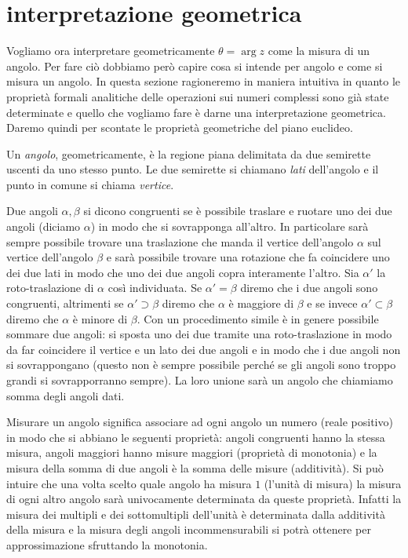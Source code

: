 \section{interpretazione geometrica}
\label{sec:radianti}

Vogliamo ora interpretare geometricamente $\theta = \arg z$ come la misura
di un angolo. Per fare ciò dobbiamo però capire cosa si intende per angolo
e come si misura un angolo.
In questa sezione ragioneremo in maniera intuitiva in quanto le proprietà
formali analitiche delle operazioni sui numeri complessi
sono già state determinate e quello
che vogliamo fare è darne una interpretazione geometrica.
Daremo quindi per scontate le proprietà geometriche del piano euclideo.

Un \emph{angolo},
geometricamente, è la regione piana delimitata da due semirette
uscenti da uno stesso punto. Le due semirette si chiamano \emph{lati}
dell'angolo e il punto in comune si chiama \emph{vertice}.

Due angoli $\alpha,\beta$ si dicono congruenti se è possibile traslare e ruotare uno dei
due angoli (diciamo $\alpha$) in modo che si sovrapponga all'altro.
In particolare sarà sempre possibile trovare una traslazione
che manda il vertice dell'angolo $\alpha$ sul vertice dell'angolo $\beta$
e sarà possibile trovare una rotazione che fa coincidere uno dei due lati
in modo che uno dei due angoli copra interamente l'altro.
Sia $\alpha'$ la roto-traslazione di $\alpha$ così individuata.
Se $\alpha'=\beta$ diremo che i due angoli sono congruenti,
altrimenti se
$\alpha' \supset \beta$ diremo che $\alpha$ è maggiore di $\beta$ e se
invece $\alpha' \subset \beta$ diremo che $\alpha$ è minore di $\beta$.
Con un procedimento simile è in genere possibile sommare due angoli:
si sposta uno dei due tramite una roto-traslazione in modo da far coincidere
il vertice e un lato dei due angoli e in modo
che i due angoli non si sovrappongano
(questo non è sempre possibile perché se gli angoli sono troppo grandi
si sovrapporranno sempre).
La loro unione sarà un angolo
che chiamiamo somma degli angoli dati.

Misurare un angolo significa associare ad ogni angolo un numero (reale positivo)
in modo che
si abbiano le seguenti proprietà: angoli congruenti hanno la stessa misura,
angoli maggiori hanno misure maggiori (proprietà di monotonia)
e la misura della somma di due angoli è la somma delle misure
(additività).
Si può intuire che una volta scelto quale angolo ha misura $1$
(l'unità di misura) la misura di ogni altro angolo sarà univocamente determinata
da queste proprietà. Infatti la misura dei multipli e dei sottomultipli
dell'unità è determinata dalla additività della misura e la misura
degli angoli incommensurabili si potrà ottenere per approssimazione
sfruttando la monotonia.

